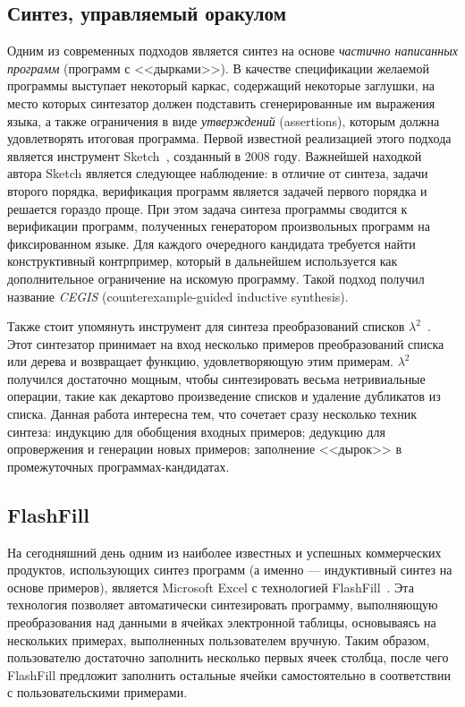 \documentclass[14pt]{matmex-diploma}
\begin{document}
\subsection{Синтез, управляемый оракулом}
Одним из современных подходов является синтез на основе \emph{частично написанных программ} (программ с <<дырками>>). В качестве спецификации желаемой программы выступает некоторый каркас, содержащий некоторые заглушки, на место которых синтезатор должен подставить сгенерированные им выражения языка, а также ограничения в виде \emph{утверждений} (assertions), которым должна удовлетворять итоговая программа. Первой известной реализацией этого подхода является инструмент Sketch~\cite{Solar-Lezama}, созданный в 2008 году.
Важнейшей находкой автора Sketch является следующее наблюдение: в отличие от синтеза, задачи второго порядка, верификация программ является задачей первого порядка и решается гораздо проще. При этом задача синтеза программы сводится к верификации программ, полученных генератором произвольных программ на фиксированном языке. Для каждого очередного кандидата требуется найти конструктивный контрпример, который в дальнейшем используется как дополнительное ограничение на искомую программу. Такой подход получил название \emph{CEGIS} (counterexample-guided inductive synthesis).

Также стоит упомянуть инструмент для синтеза преобразований списков ${\lambda}^2$~\cite{Lambda2}. Этот синтезатор принимает на вход несколько примеров преобразований списка или дерева и возвращает функцию, удовлетворяющую этим примерам. ${\lambda}^2$ получился достаточно мощным, чтобы синтезировать весьма нетривиальные операции, такие как декартово произведение списков и удаление дубликатов из списка. Данная работа интересна тем, что сочетает сразу несколько техник синтеза: индукцию для обобщения входных примеров; дедукцию для опровержения и генерации новых примеров; заполнение <<дырок>> в промежуточных программах-кандидатах.

\subsection{FlashFill}
На сегодняшний день одним из наиболее известных и успешных коммерческих продуктов, использующих синтез программ (а именно --- индуктивный синтез на основе примеров), является Microsoft Excel с технологией FlashFill~\cite{FlashFill}. Эта технология позволяет автоматически синтезировать программу, выполняющую преобразования над данными в ячейках электронной таблицы, основываясь на нескольких примерах, выполненных пользователем вручную. Таким образом, пользователю достаточно заполнить несколько первых ячеек столбца, после чего FlashFill предложит заполнить остальные ячейки самостоятельно в соответствии с пользовательскими примерами.
\end{document}
